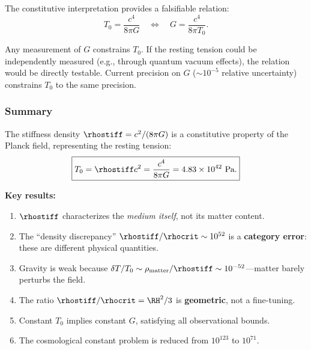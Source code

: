 The constitutive interpretation provides a falsifiable relation:
\begin{equation}
\boxed{T_0 = \frac{c^4}{8\pi G} \quad \Leftrightarrow \quad G = \frac{c^4}{8\pi T_0}.}
\end{equation}

Any measurement of $G$ constrains $T_0$. If the resting tension could be independently measured (e.g., through quantum vacuum effects), the relation would be directly testable. Current precision on $G$ ($\sim 10^{-5}$ relative uncertainty) constrains $T_0$ to the same precision.

\subsubsection{Summary}
\label{sec:tension_summary}

The stiffness density $\rhostiff = c^2/(8\pi G)$ is a constitutive property of the Planck field, representing the resting tension:
\begin{equation}
\boxed{T_0 = \rhostiff c^2 = \frac{c^4}{8\pi G} = 4.83 \times 10^{42} \text{ Pa}.}
\end{equation}

\textbf{Key results:}
\begin{enumerate}
    \item $\rhostiff$ characterizes the \emph{medium itself}, not its matter content.
    \item The ``density discrepancy'' $\rhostiff/\rhocrit \sim 10^{52}$ is a \textbf{category error}: these are different physical quantities.
    \item Gravity is weak because $\delta T/T_0 \sim \rho_{\mathrm{matter}}/\rhostiff \sim 10^{-52}$---matter barely perturbs the field.
    \item The ratio $\rhostiff/\rhocrit = \RH^2/3$ is \textbf{geometric}, not a fine-tuning.
    \item Constant $T_0$ implies constant $G$, satisfying all observational bounds.
    \item The cosmological constant problem is reduced from $10^{123}$ to $10^{71}$.
\end{enumerate}

